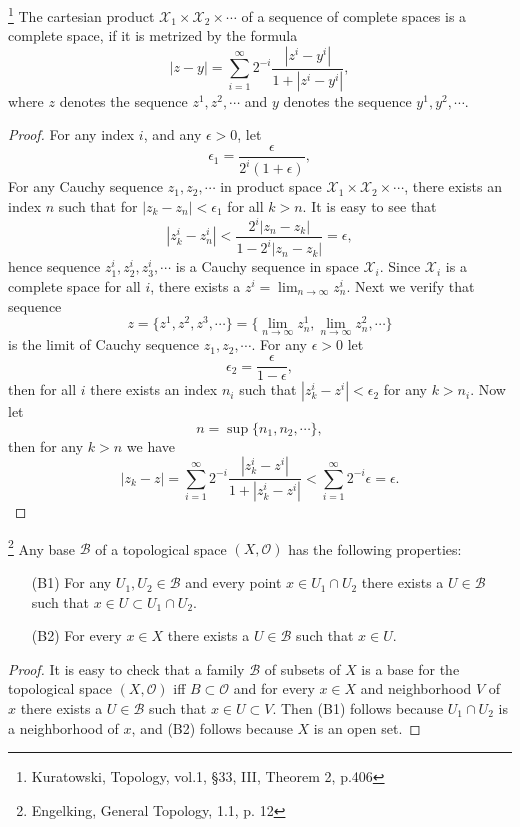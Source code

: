 \begin{theorem} \label{T:prod_complt}
\footnote{Kuratowski, Topology, vol.1, \S 33, III, Theorem 2, p.406}
The cartesian product $\mathcal{X}_1 \times\mathcal{X}_2 \times \cdots$ of a
sequence of complete spaces is a complete space, if it is metrized by the
formula
\[
  |z-y| = \sum_{i=1}^{\infty} 2^{-i} \frac{|z^i-y^i|}{1+|z^i-y^i|},
\]
where $z$ denotes the sequence $z^1,z^2,\cdots$ and $y$ denotes the sequence 
$y^1,y^2,\cdots$.
\end{theorem}
\begin{proof}
For any index $i$, and any $\epsilon>0$, let 
\[
  \epsilon_1 = \frac{\epsilon}{2^i (1+\epsilon)},
\]
For any Cauchy sequence $z_1,z_2,\cdots$ in product space
$\mathcal{X}_1 \times\mathcal{X}_2 \times \cdots$, there exists an index $n$
such that for $|z_k-z_n|<\epsilon_1$ for all $k>n$. It is easy to see that
\[
  |z_k^i-z_n^i| < \frac{2^i |z_n-z_k|}{1- 2^i |z_n-z_k|} = \epsilon,
\]
hence sequence $z_1^i,z_2^i,z_3^i,\cdots$ is a Cauchy sequence in space
$\mathcal{X}_i$. Since $\mathcal{X}_i$ is a complete space for all $i$, there 
exists a $z^i=\lim_{n\to\infty} z_n^i$.
Next we verify that sequence 
\[
  z= \{ z^1,z^2,z^3,\cdots\} 
   = \{\lim_{n\to\infty} z_n^1, \lim_{n\to\infty} z_n^2, \cdots \}
\]
is the limit of Cauchy
sequence $z_1,z_2,\cdots$. For any $\epsilon>0$ let 
\[
  \epsilon_2=\frac{\epsilon}{1-\epsilon},
\]
then for all $i$ there exists an index $n_i$ such that $|z_k^i-z^i|<\epsilon_2$
for any $k>n_i$. Now let
\[
  n = \sup\{n_1,n_2,\cdots\},
\]
then for any $k>n$ we have
\[
  |z_k-z| = \sum_{i=1}^{\infty} 2^{-i} \frac{|z_k^i-z^i|}{1+|z_k^i-z^i|}
          <  \sum_{i=1}^{\infty} 2^{-i} \epsilon = \epsilon.
\]
\end{proof}

\begin{proposition}
\footnote{Engelking, General Topology, 1.1, p. 12}
Any base $\mathcal{B}$ of a topological space $(X,\mathcal{O})$ has the 
following properties:
\begin{enumerate}
  \item[(B1)]For any $U_1,U_2\in\mathcal{B}$ and every point $x\in U_1\cap U_2$
             there exists a $U\in\mathcal{B}$ such that 
             $x\in U\subset U_1\cap U_2$.
  \item[(B2)] For every $x\in X$ there exists a $U\in\mathcal{B}$ such that
              $x\in U$.
\end{enumerate}
\end{proposition}
\begin{proof}
It is easy to check that a family $\mathcal{B}$ of subsets of $X$ is a base for
the topological space $(X,\mathcal{O})$ iff $B\subset \mathcal{O}$ and for every
$x\in X$ and neighborhood $V$ of $x$ there exists a $U\in\mathcal{B}$ such that
$x\in U\subset V$. Then (B1) follows because $U_1\cap U_2$ is a neighborhood of
$x$, and (B2) follows because $X$ is an open set.
\end{proof}


